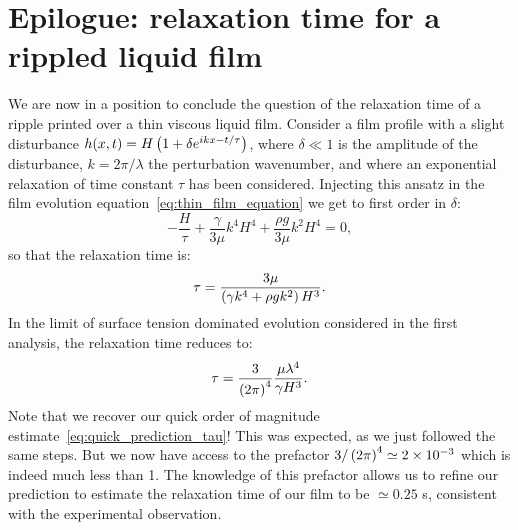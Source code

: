 \section{Epilogue: relaxation time for a rippled liquid film}
We are now in a position to conclude the question of the relaxation time of a ripple printed over a thin viscous liquid film. Consider a film profile with a slight disturbance $h(x,t) = H\left( 1 + \delta e^{ikx-t/\tau}\right)$, where $\delta\ll 1$ is the amplitude of the disturbance, $k = 2 \pi / \lambda$ the perturbation wavenumber, and where an exponential relaxation of time constant $\tau$ has been considered. Injecting this ansatz in the film evolution equation~\eqref{eq:thin_film_equation} we get to first order in $\delta$:
\begin{equation}
-\frac{H}{\tau} + \frac{\gamma}{3\mu}k^4H^4 + \frac{\rho g}{3\mu} k^2 H^4 = 0,
\end{equation}
so that the relaxation time is:
\begin{equation}
\tau = \frac{3 \mu}{\left(\gamma k^4 + \rho g k^2\right) H^3}.
\end{equation}
In the limit of surface tension dominated evolution considered in the first analysis, the relaxation time reduces to:
\begin{equation}
\tau = \frac{3}{\left( 2 \pi\right)^4}\frac{\mu\lambda^4}{\gamma H^3}.
\end{equation}
Note that we recover our quick order of magnitude estimate~\eqref{eq:quick_prediction_tau}! This was expected, as we just followed the same steps. But we now have access to the prefactor $3/\left( 2 \pi\right)^4\simeq 2\times 10^{-3}$ which is indeed much less than 1. The knowledge of this prefactor allows us to refine our prediction to estimate the relaxation time of our film to be $\simeq 0.25$ s, consistent with the experimental observation.